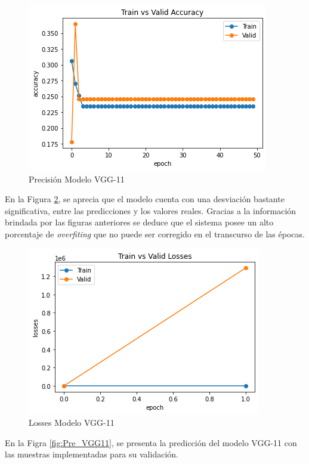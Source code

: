 			
			\begin{figure}[ht]
				\centering
				\includegraphics[scale=0.5]{Figs/105.png}
				\caption{Precisión Modelo VGG-11}
				\label{fig:precision_VGG11}
			\end{figure}
			
			En la Figura \ref{fig:loses_VGG11}, se aprecia que el modelo cuenta con una desviación bastante significativa, entre las predicciones y los valores reales. Gracias a la información brindada por las figuras anteriores se deduce que el sistema posee un alto porcentaje de \textit{overfiting} que no puede ser corregido en el transcurso de las épocas.
			
			\begin{figure}[ht]
				\centering
				\includegraphics[scale=0.5]{Figs/106.png}
				\caption{Losses Modelo VGG-11}
				\label{fig:loses_VGG11}
			\end{figure}
			
			En la Figra \ref{fig:Pre_VGG11}, se presenta la predicción del modelo VGG-11 con las muestras implementadas para su validación.
						

